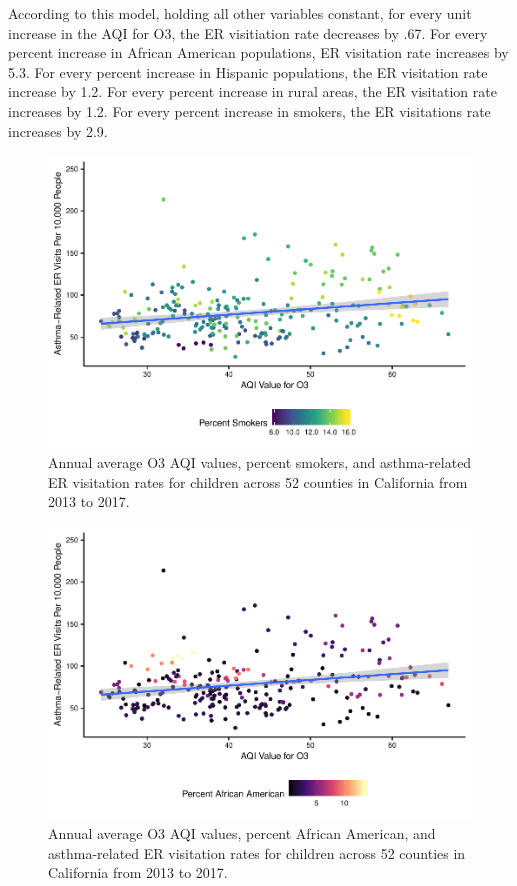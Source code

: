 \documentclass[12pt,]{article}
\begin{document}
According to this model, holding all other variables constant, for every
unit increase in the AQI for O3, the ER visitiation rate decreases by
.67. For every percent increase in African American populations, ER
visitation rate increases by 5.3. For every percent increase in Hispanic
populations, the ER visitation rate increase by 1.2. For every percent
increase in rural areas, the ER visitation rate increases by 1.2. For
every percent increase in smokers, the ER visitations rate increases by
2.9.

\begin{figure}
\centering
\includegraphics{FinalProject_AliciaZhao_files/figure-latex/unnamed-chunk-22-1.pdf}
\caption{Annual average O3 AQI values, percent smokers, and
asthma-related ER visitation rates for children across 52 counties in
California from 2013 to 2017.}
\end{figure}

\begin{figure}
\centering
\includegraphics{FinalProject_AliciaZhao_files/figure-latex/unnamed-chunk-23-1.pdf}
\caption{Annual average O3 AQI values, percent African American, and
asthma-related ER visitation rates for children across 52 counties in
California from 2013 to 2017.}
\end{figure}
\end{document}
